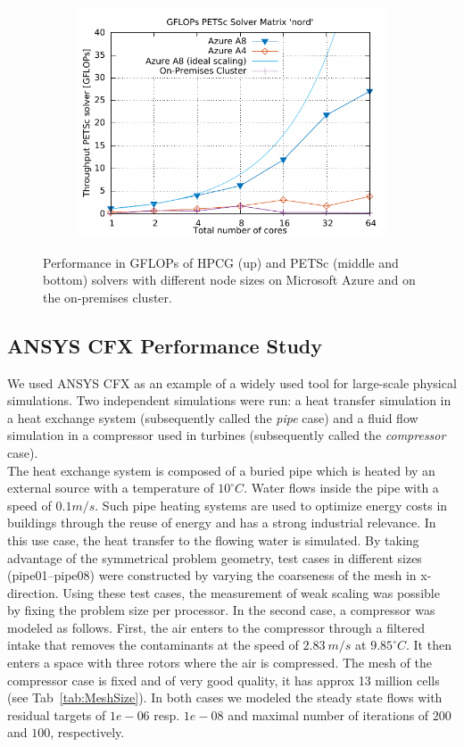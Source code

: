 \documentclass[a4paper,twoside]{article}
\begin{document}
\begin{figure}[!h]
\begin{subfigure}
  \centering
  \includegraphics[width=\linewidth]{gplt-gflops-nord}
\end{subfigure}

\caption{Performance in GFLOPs of HPCG (up) and PETSc (middle and bottom) solvers with different node sizes on Microsoft Azure and on the on-premises cluster. }
\label{fig:test}
\end{figure}


\subsection{ANSYS CFX Performance Study}
We used ANSYS CFX as an example of a widely used tool for large-scale physical simulations. Two independent simulations were run: a heat transfer simulation in a heat exchange system (subsequently called the \textit{pipe} case) and a fluid flow simulation in a compressor used in turbines (subsequently called the \textit{compressor} case).\\
The heat exchange system is composed of a buried pipe which is heated by an external source with a temperature of  $10 ^\circ C$. Water flows inside the pipe with a speed of $0.1m/s$. Such pipe heating systems are used to optimize energy costs in buildings through the reuse of energy and has a strong industrial relevance. In this use case, the heat transfer to the flowing water is simulated. By taking advantage of the symmetrical problem geometry, test cases in different sizes (pipe01--pipe08) were constructed by varying the coarseness of the mesh in x-direction. Using these test cases, the measurement of weak scaling was possible by fixing the problem size per processor.
In the second case, a compressor was modeled as follows. First, the air enters to the compressor through a filtered intake that removes the contaminants at the speed of $2.83\ m/s$ at $9.85 ^\circ C$. It then enters a space with three rotors where the air is compressed. The mesh of the compressor case is fixed and of very good quality, it has approx 13 million cells (see Tab~\ref{tab:MeshSize}). In both cases we modeled the steady state flows with residual targets of $1e-06$ resp. $1e-08$ and maximal number of iterations of $200$ and $100$, respectively. 
\end{document}
